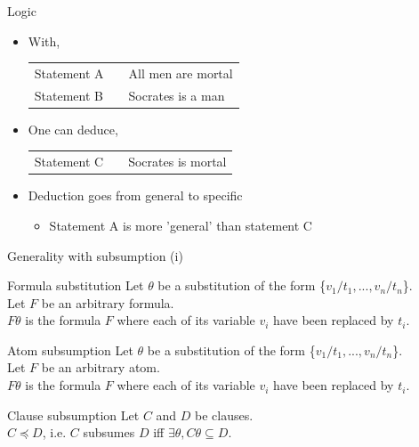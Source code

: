 \begin{frame}{Logic}

    
\vfill
\begin{itemize}
    \item With,
    \vfill
\begin{center}
\begin{tabular}{lll}
    Statement A & & All men are mortal \\
    Statement B & & Socrates is a man
\end{tabular}
\end{center}
    \vfill
    \item One can deduce,
    \vfill
\begin{center}
\begin{tabular}{lll}
    Statement C & & Socrates is mortal \\
\end{tabular}
\end{center}
\vfill \item Deduction goes from general to specific
\begin{itemize}
    \item[\ding{43}] Statement A is more 'general' than statement C
\end{itemize}
\end{itemize}
\vfill    

\end{frame}

\begin{frame}{Generality with subsumption (i)}
\vfill
\begin{block}{Formula substitution}
Let $\theta$ be a substitution of the form \{$v_1/t_1, ..., v_n/t_n$\}. \\
Let $F$ be an arbitrary formula. \\
$F\theta$ is the formula $F$ where each of its variable $v_i$ have been replaced by $t_i$.
\end{block}
\vfill
\begin{block}{Atom subsumption}
Let $\theta$ be a substitution of the form \{$v_1/t_1, ..., v_n/t_n$\}. \\
Let $F$ be an arbitrary atom. \\
$F\theta$ is the formula $F$ where each of its variable $v_i$ have been replaced by $t_i$.
\end{block}
\vfill
\begin{block}{Clause subsumption}
Let $C$ and $D$ be clauses. \\
$C \preceq D$, i.e. $C$ subsumes $D$ iff $\exists \theta, C\theta \subseteq D$.
\end{block}
\vfill
\end{frame}

